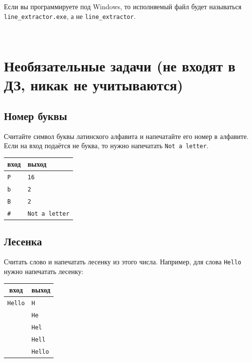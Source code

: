 \documentclass[10pt]{article}
\begin{document}
\noindent Если вы программируете под Windows, то исполняемый файл будет называться \texttt{line\_extractor.exe}, а не \texttt{line\_extractor}.



\newpage
~
\newpage
\section*{Необязательные задачи (не входят в ДЗ, никак не учитываются)}
\setcounter{subsection}{0}

\subsection{Номер буквы}
Считайте символ буквы латинского алфавита и напечатайте его номер в алфавите. Если на вход подаётся не буква, то нужно напечатать \texttt{Not a letter}.
\begin{center}
\begin{tabular}{ l | l }
 вход & выход \\ \hline
 \texttt{P} & \texttt{16} \\
 \texttt{b} & \texttt{2} \\
 \texttt{B} & \texttt{2} \\
 \texttt{\#} & \texttt{Not a letter}\\ 
\end{tabular}
\end{center}

\subsection{Лесенка}
Считать слово и напечатать лесенку из этого числа. Например, для слова \texttt{Hello} нужно напечатать лесенку: 
\begin{center}
\begin{center}
\begin{tabular}{ c | l }
 вход & выход \\ \hline
 \texttt{Hello} & \texttt{H}  \\ 
 & \texttt{He} \\
 & \texttt{Hel} \\
 & \texttt{Hell} \\
 & \texttt{Hello}\\ 
\end{tabular}
\end{center}
\end{center}
\end{document}
